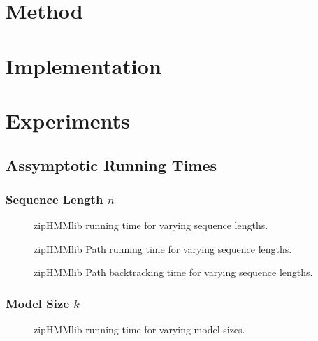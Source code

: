 \documentclass[oneside,a4,danish,english,report]{memoir}
\begin{document}
\chapter{Method}
\label{cha:method}

\chapter{Implementation}
\label{cha:implementation}

\chapter{Experiments}
\label{cha:experiments}

\section{Assymptotic Running Times}
\label{sec:assymp-runn-times}

\subsection{Sequence Length $n$}
\label{sec:sequence-length-n}

\begin{figure}[H]
  \centering
  
  \caption{zipHMMlib running time for varying sequence lengths.}
  \label{fig:assymptotic_viterbi_n}
\end{figure}

\begin{figure}[H]
  \centering
  
  \caption{zipHMMlib Path running time for varying sequence lengths.}
  \label{fig:assymptotic_viterbi_path_n}
\end{figure}

\begin{figure}[H]
  \centering
  
  \caption{zipHMMlib Path backtracking time for varying sequence lengths.}
  \label{fig:assymptotic_viterbi_backtrack_n}
\end{figure}

\subsection{Model Size $k$}
\label{sec:model-size-k}

\begin{figure}[H]
  \centering
  
  \caption{zipHMMlib running time for varying model sizes.}
  \label{fig:assymptotic_viterbi_k}
\end{figure}
\end{document}
